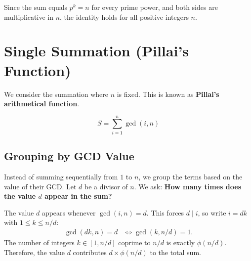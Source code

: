 \documentclass[11pt]{article}
\begin{document}
\begin{center}
    \captionsetup{hypcap=false}
\end{center}

Since the sum equals $p^k = n$ for every prime power, and both sides are multiplicative in $n$, the identity holds for all positive integers $n$.

\pagebreak
\section{Single Summation (Pillai's Function)}
\label{sec:pillai}

We consider the summation where $n$ is fixed. This is known as \textbf{Pillai's arithmetical function}.

\[ S = \sum_{i=1}^n \gcd(i, n) \]

\subsection{Grouping by GCD Value}
Instead of summing sequentially from $1$ to $n$, we group the terms based on the value of their GCD. Let $d$ be a divisor of $n$. We ask: \textbf{How many times does the value $d$ appear in the sum?}

\begin{derivation}
    The value $d$ appears whenever $\gcd(i, n) = d$. This forces $d \mid i$, so write $i = dk$ with $1 \le k \le n/d$:
    \begin{align*}
        \gcd(dk, n) = d & \iff \gcd(k, n/d) = 1.
    \end{align*}
    The number of integers $k \in [1, n/d]$ coprime to $n/d$ is exactly $\phi(n/d)$.
    Therefore, the value $d$ contributes $d \times \phi(n/d)$ to the total sum.
\end{derivation}
\end{document}
